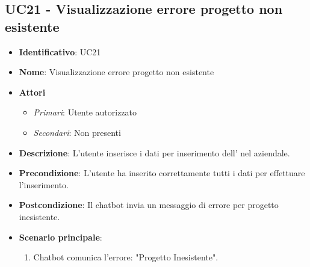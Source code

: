 \subsection{UC21 - Visualizzazione errore progetto non esistente}
\begin{itemize}
	\item \textbf{Identificativo}: UC21
	\item \textbf{Nome}: Visualizzazione errore progetto non esistente
	\item \textbf{Attori}
	\begin{itemize} 
		\item \textit{Primari}: Utente autorizzato
		\item \textit{Secondari}: Non presenti
	\end{itemize}
	\item \textbf{Descrizione}: L'utente inserisce i dati per inserimento dell' nel  aziendale.
	\item \textbf{Precondizione}: L'utente ha inserito correttamente tutti i dati per effettuare l'inserimento.
	\item \textbf{Postcondizione}: Il chatbot invia un messaggio di errore per progetto inesistente.
	\item \textbf{Scenario principale}: \begin{enumerate}
		\item Chatbot comunica l'errore: "Progetto Inesistente".
	\end{enumerate}
\end{itemize}
